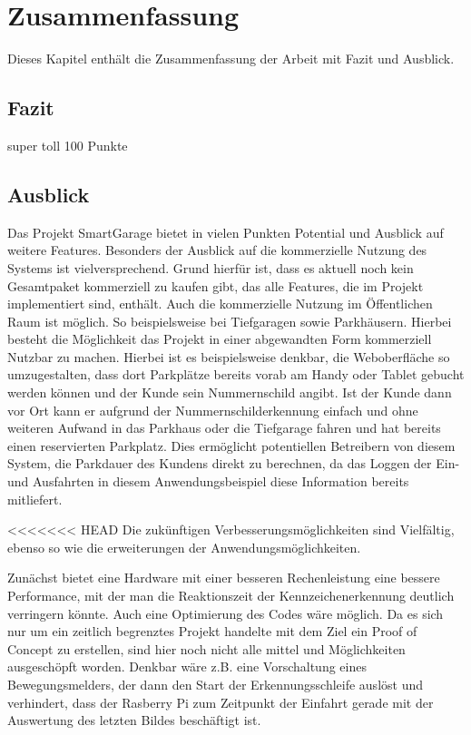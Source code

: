 \chapter{Zusammenfassung}

\nocite{*}

Dieses Kapitel enthält die Zusammenfassung der Arbeit mit Fazit und Ausblick.

\section{Fazit}

super toll 100 Punkte

\section{Ausblick}
Das Projekt SmartGarage bietet in vielen Punkten Potential und Ausblick auf weitere Features. Besonders der Ausblick auf die kommerzielle Nutzung des Systems ist vielversprechend. Grund hierfür ist, dass es aktuell noch kein Gesamtpaket kommerziell zu kaufen gibt, das alle Features, die im Projekt implementiert sind, enthält. Auch die kommerzielle Nutzung im Öffentlichen Raum ist möglich. So beispielsweise bei Tiefgaragen sowie Parkhäusern. Hierbei besteht die Möglichkeit das Projekt in einer abgewandten Form kommerziell Nutzbar zu machen. Hierbei ist es beispielsweise denkbar, die Weboberfläche so umzugestalten, dass dort Parkplätze bereits vorab am Handy oder Tablet gebucht werden können und der Kunde sein Nummernschild angibt. Ist der Kunde dann vor Ort kann er aufgrund der Nummernschilderkennung einfach und ohne weiteren Aufwand in das Parkhaus oder die Tiefgarage fahren und hat bereits einen reservierten Parkplatz. Dies ermöglicht potentiellen Betreibern von diesem System, die Parkdauer des Kundens direkt zu berechnen, da das Loggen der Ein- und Ausfahrten in diesem Anwendungsbeispiel diese Information bereits mitliefert. 

<<<<<<< HEAD
Die zukünftigen Verbesserungsmöglichkeiten sind Vielfältig, ebenso so wie die erweiterungen der Anwendungsmöglichkeiten.

Zunächst bietet eine Hardware mit einer besseren Rechenleistung eine bessere Performance, mit der man die Reaktionszeit der Kennzeichenerkennung deutlich verringern könnte. Auch eine Optimierung des Codes wäre möglich. Da es sich nur um ein zeitlich begrenztes Projekt handelte mit dem Ziel ein Proof of Concept zu erstellen, sind hier noch nicht alle mittel und Möglichkeiten ausgeschöpft worden. Denkbar wäre z.B. eine Vorschaltung eines Bewegungsmelders, der dann den Start der Erkennungsschleife auslöst und verhindert, dass der Rasberry Pi zum Zeitpunkt der Einfahrt gerade mit der Auswertung des letzten Bildes beschäftigt ist.

